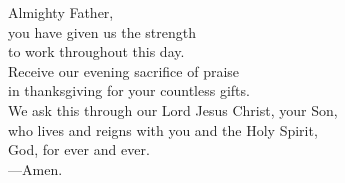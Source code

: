 \prayer


\begin{prayerverse}
Almighty Father,\\
you have given us the strength\\
to work throughout this day.\\
Receive our evening sacrifice of praise\\
in thanksgiving for your countless gifts.\\
We ask this through our Lord Jesus Christ, your Son,\\
who lives and reigns with you and the Holy Spirit,\\
God, for ever and ever.\\
{\color{red}---\thinspace}Amen.
\end{prayerverse}

